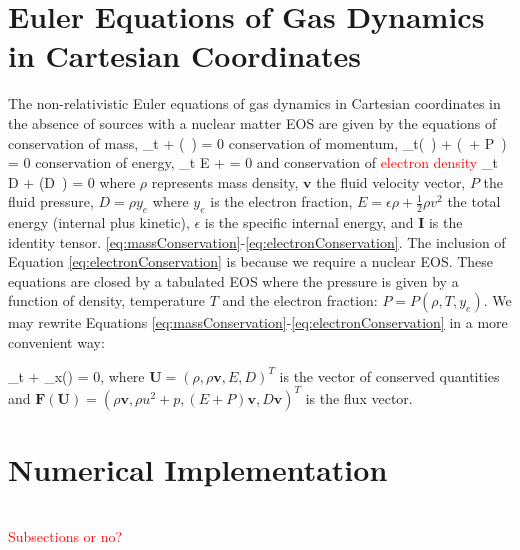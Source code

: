 \documentclass[onecolumn]{aastex62}
\begin{document}
\section{Euler Equations of Gas Dynamics in Cartesian Coordinates}
\label{sec:eulereq}
The non-relativistic Euler equations of gas dynamics
\citep[see, e.g.,][for details]{leveque:2002} in Cartesian coordinates
in the absence of sources with a nuclear matter EOS are given by
the equations of conservation of mass,
\beq
  \partial_{t} \rho + \divergence{} (\rho\,  ) = 0
  \label{eq:massConservation}
\eeq
conservation of momentum,
\beq
  \partial_{t}(\rho\,  ) + \divergence{}(\rho\,   \otimes {} + P\, ) = 0
  \label{eq:momentumConservation}
\eeq
conservation of energy,
\beq
  \partial_{t} E + \divergence{} = 0
  \label{eq:energyConservation}
\eeq
and conservation of \textcolor{red}{electron density}
\beq
  \partial_{t} D + \divergence{}(D\, ) = 0
  \label{eq:electronConservation}
\eeq
where $\rho$ represents mass density, $\mathbf{v}$ the fluid velocity vector,
$P$ the fluid pressure, $D=\rho y_e$ where $y_e$ is the electron fraction,
$E=\epsilon \rho +\frac{1}{2}\rho v^2$ the total energy (internal plus kinetic),
$\epsilon$ is the specific internal energy, and $\mathbf{I}$ is the identity tensor.
\eqref{eq:massConservation}-\eqref{eq:electronConservation}. The inclusion of
Equation \eqref{eq:electronConservation} is because we require a nuclear EOS.
These equations are closed by a tabulated EOS where the pressure is given by a function of
density, temperature $T$ and the electron fraction: $P = P(\rho, T, y_e)$.
We may rewrite Equations \eqref{eq:massConservation}-\eqref{eq:electronConservation}
in a more convenient way:

\beq
  \partial_{t} + \partial_{x}() = 0,
  \label{eq:conservation}
\eeq
where $\mathbf{U} =(\rho,\rho \mathbf{v},E, D)^{T}$ is the vector of conserved quantities
and $\mathbf{F}(\mathbf{U})=(\rho \mathbf{v},\rho u^{2}+p,(E+P)\mathbf{v}, D\mathbf{v})^{T}$
is the flux vector.

\section{Numerical Implementation}
\label{sec:DG}

 \\
\textcolor{red}{Subsections or no?}
\end{document}
